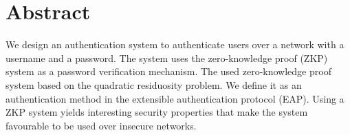 \section*{Abstract} 
We design an authentication system to authenticate users over a network with a username and a password.
The system uses the zero-knowledge proof (ZKP) system as a password verification mechanism.
The used zero-knowledge proof system based on the quadratic residuosity problem.
We define it as an authentication method in the extensible authentication protocol (EAP).
Using a ZKP system yields interesting security properties that make the system favourable to be used over insecure networks.
\newpage